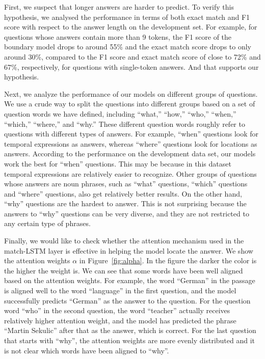 \documentclass{article} \usepackage{iclr2017_conference,times}
\begin{document}
First, we suspect that longer answers are harder to predict.
To verify this hypothesis, we analysed the performance in terms of both exact match and F1 score with respect to the answer length on the development set.
For example, for questions whose answers contain more than 9 tokens, the F1 score of the boundary model drops to around 55\% and the exact match score drops to only around 30\%, compared to the F1 score and exact match score of close to 72\% and 67\%, respectively, for questions with single-token answers. And that supports our hypothesis.

Next, we analyze the performance of our models on different groups of questions.
We use a crude way to split the questions into different groups based on a set of question words we have defined, including ``what,'' ``how,'' ``who,'' ``when,''  ``which,'' ``where,'' and ``why.''
These different question words roughly refer to questions with different types of answers.
For example, ``when'' questions look for temporal expressions as answers, whereas ``where'' questions look for locations as answers.
According to the performance on the development data set, our models work the best for ``when'' questions.
This may be because in this dataset temporal expressions are relatively easier to recognize.
Other groups of questions whose answers are noun phrases, such as ``what'' questions, ``which'' questions and ``where'' questions, also get relatively better results.
On the other hand, ``why'' questions are the hardest to answer.
This is not surprising because the answers to ``why'' questions can be very diverse, and they are not restricted to any certain type of phrases.



Finally, we would like to check whether the attention mechanism used in the match-LSTM layer is effective in helping the model locate the answer.
We show the attention weights $\alpha$ in Figure~\ref{fig:alpha}.
In the figure the darker the color is the higher the weight is.
We can see that some words have been well aligned based on the attention weights.
For example, the word ``German'' in the passage is aligned well to the word ``language'' in the first question, and the model successfully predicts ``German'' as the answer to the question.
For the question word ``who'' in the second question, the word ``teacher'' actually receives relatively higher attention weight, and the model has predicted the phrase ``Martin Sekulic'' after that as the answer, which is correct.
For the last question that starts with ``why'', the attention weights are more evenly distributed and it is not clear which words have been aligned to ``why''.
\end{document}
